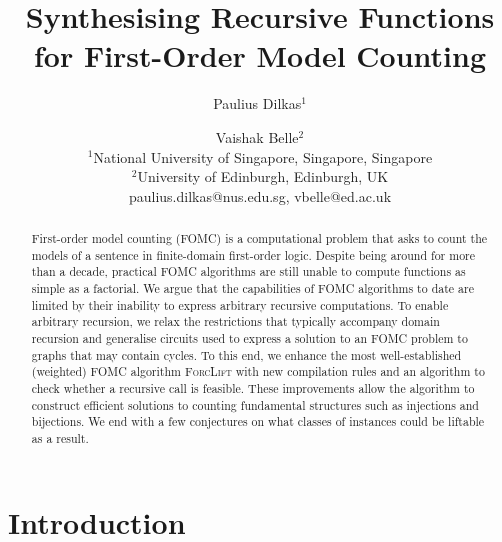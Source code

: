 \documentclass{article}
\title{Synthesising Recursive Functions for First-Order Model Counting}
\author{%
Paulius Dilkas$^1$\and
Vaishak Belle$^2$\\
\affiliations
$^1$National University of Singapore, Singapore, Singapore\\
$^2$University of Edinburgh, Edinburgh, UK\\
\emails
paulius.dilkas@nus.edu.sg,
vbelle@ed.ac.uk
}
\theoremstyle{definition}
\begin{document}
\maketitle

\begin{abstract}
  First-order model counting (FOMC) is a computational problem that asks to
  count the models of a sentence in finite-domain first-order logic. Despite
  being around for more than a decade, practical FOMC algorithms are still
  unable to compute functions as simple as a factorial. We argue that the
  capabilities of FOMC algorithms to date are limited by their inability to
  express arbitrary recursive computations. To enable arbitrary recursion, we
  relax the restrictions that typically accompany domain recursion and
  generalise circuits used to express a solution to an FOMC problem to graphs
  that may contain cycles. To this end, we enhance the most well-established
  (weighted) FOMC algorithm \textsc{ForcLift} with new compilation rules and an
  algorithm to check whether a recursive call is feasible. These improvements
  allow the algorithm to construct efficient solutions to counting fundamental
  structures such as injections and bijections. We end with a few conjectures on
  what classes of instances could be liftable as a result.
\end{abstract}

\section{Introduction}\label{sec:introduction}

\end{document}
